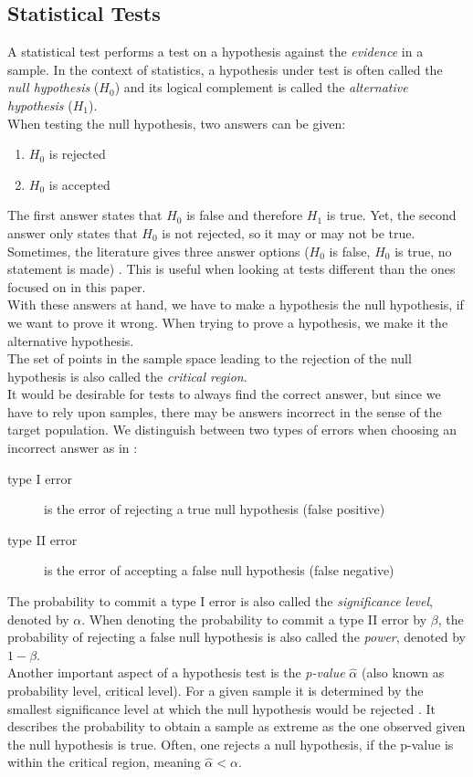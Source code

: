 \documentclass{article}
\theoremstyle{definition}
\begin{document}
\subsection{Statistical Tests}
A statistical test performs a test on a hypothesis against the \emph{evidence} in a sample.
In the context of statistics, a hypothesis under test is often called the \emph{null hypothesis} ($H_0$) and its logical complement is called the \emph{alternative hypothesis} ($H_1$).
\\
When testing the null hypothesis, two answers can be given:
\begin{enumerate}
	\item $H_0$ is rejected
	\item $H_0$ is accepted
\end{enumerate}
The first answer states that $H_0$ is false and therefore $H_1$ is true.
Yet, the second answer only states that $H_0$ is not rejected, so it may or may not be true.
Sometimes, the literature gives three answer options ($H_0$ is false, $H_0$ is true, no statement is made) \cite{weigand2009statistik}.
This is useful when looking at tests different than the ones focused on in this paper.
\\
With these answers at hand, we have to make a hypothesis the null hypothesis, if we want to prove it wrong.
When trying to prove a hypothesis, we make it the alternative hypothesis.
\\
The set of points in the sample space leading to the rejection of the null hypothesis is also called the \emph{critical region}.
\\
It would be desirable for tests to always find the correct answer, but since we have to rely upon samples, there may be answers incorrect in the sense of the target population.
We distinguish between two types of errors when choosing an incorrect answer as in \cite{conover1980practical}:
\begin{description}
	\item[type I error] is the error of rejecting a true null hypothesis (false positive)
	\item[type II error] is the error of accepting a false null hypothesis (false negative)
\end{description}
The probability to commit a type I error is also called the \emph{significance level}, denoted by $\alpha$.
When denoting the probability to commit a type II error by $\beta$, the probability of rejecting a false null hypothesis is also called the \emph{power}, denoted by $1-\beta$.
\\
Another important aspect of a hypothesis test is the \emph{p-value} $\hat{\alpha}$ (also known as probability level, critical level).
For a given sample it is determined by the smallest significance level at which the null hypothesis would be rejected \cite{conover1980practical}.
It describes the probability to obtain a sample as extreme as the one observed given the null hypothesis is true.
Often, one rejects a null hypothesis, if the p-value is within the critical region, meaning $\hat{\alpha} < \alpha$.
\end{document}
